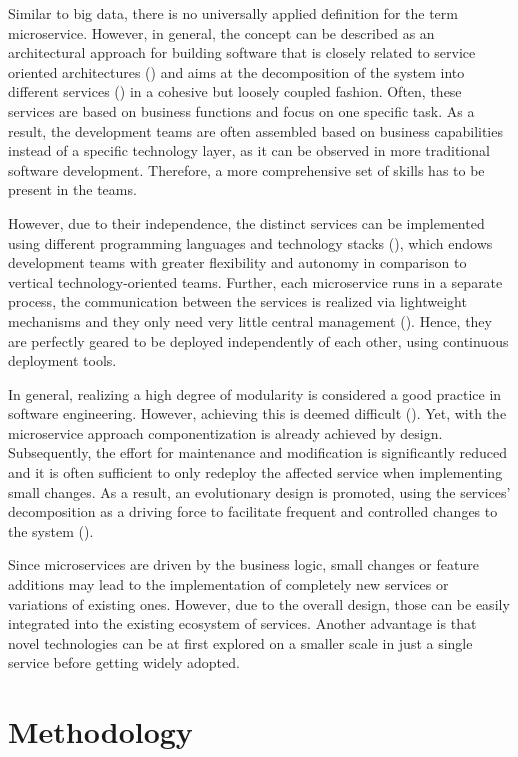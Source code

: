 \documentclass[conference]{IEEEtran}
\begin{document}
Similar to big data, there is no universally applied definition for the term microservice. However, in general, the concept can be described as an architectural approach for building software that is closely related to service oriented architectures (\cite{Jamshidi.2018}) and aims at the decomposition of the system into different services (\cite{Nadareishvili.2016}) in a cohesive but loosely coupled fashion. Often, these services are based on business functions and focus on one specific task. As a result, the development teams are often assembled based on business capabilities instead of a specific technology layer, as it can be observed in more traditional software development. Therefore, a more comprehensive set of skills has to be present in the teams.

However, due to their independence, the distinct services can be implemented using different programming languages and technology stacks (\cite{Freymann.2020}), which endows development teams with greater flexibility and autonomy in comparison to vertical technology-oriented teams. Further, each microservice runs in a separate process, the communication between the services is realized via lightweight mechanisms and they only need very little central management (\cite{Drews.2017}). Hence, they are perfectly geared to be deployed independently of each other, using continuous deployment tools.

In general, realizing a high degree of modularity is considered a good practice in software engineering. However, achieving this is deemed difficult (\cite{Faitelson.2018}). Yet, with the microservice approach componentization is already achieved by design. Subsequently, the effort for maintenance and modification is significantly reduced and it is often sufficient to only redeploy the affected service when implementing small changes. As a result, an evolutionary design is promoted, using the services’ decomposition as a driving force to facilitate frequent and controlled changes to the system (\cite{Krylovskiy}).

Since microservices are driven by the business logic, small changes or feature additions may lead to the implementation of completely new services or variations of existing ones. However, due to the overall design, those can be easily integrated into the existing ecosystem of services. Another advantage is that novel technologies can be at first explored on a smaller scale in just a single service before getting widely adopted.

\section{Methodology}
\end{document}
